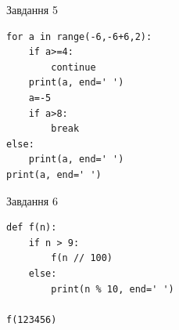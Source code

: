 \documentclass[12pt, ukrainian]{article}
\begin{document}
{\vspace{15mm}
\begin{minipage}[t]{9.7cm}                
{\begin{center}Завдання {5}\end{center}}
\begin{verbatim}
for a in range(-6,-6+6,2):
    if a>=4:
        continue
    print(a, end=' ')
    a=-5
    if a>8:
        break
else:
    print(a, end=' ')
print(a, end=' ')
\end{verbatim}     
\end{minipage}
\vline \hspace{8mm}
\begin{minipage}[t]{8.0cm}                
{\begin{center}Завдання {6}\end{center}}
\begin{verbatim}
def f(n):
    if n > 9:
        f(n // 100)
    else:
        print(n % 10, end=' ')

f(123456)
\end{verbatim}     
\end{minipage}

}
\newpage
\end{document}
